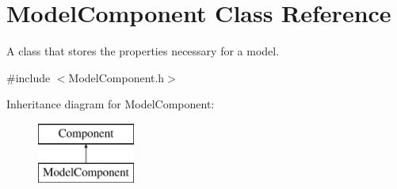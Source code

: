 \hypertarget{class_model_component}{}\section{Model\+Component Class Reference}
\label{class_model_component}


A class that stores the properties necessary for a model.  




{\ttfamily \#include $<$Model\+Component.\+h$>$}

Inheritance diagram for Model\+Component\+:\begin{figure}[H]
\begin{center}
\leavevmode
\includegraphics[height=2.000000cm]{class_model_component}
\end{center}
\end{figure}
